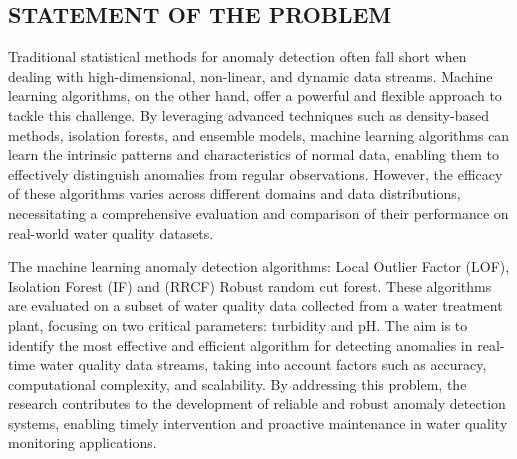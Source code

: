 \documentclass[12pt]{report}
\begin{document}
\subsection{STATEMENT OF THE PROBLEM}
\par
Traditional statistical methods for anomaly detection often fall short when dealing with high-dimensional, non-linear, and dynamic data streams. Machine learning algorithms, on the other hand, offer a powerful and flexible approach to tackle this challenge. By leveraging advanced techniques such as density-based methods, isolation forests, and ensemble models, machine learning algorithms can learn the intrinsic patterns and characteristics of normal data, enabling them to effectively distinguish anomalies from regular observations. However, the efficacy of these algorithms varies across different domains and data distributions, necessitating a comprehensive evaluation and comparison of their performance on real-world water quality datasets.
\par
The  machine learning anomaly detection algorithms: Local Outlier Factor (LOF), Isolation Forest (IF) and  (RRCF) Robust
random cut forest. These algorithms are evaluated on a subset of water quality data collected from a water treatment plant, focusing on two critical parameters: turbidity and pH. The aim is to identify the most effective and efficient algorithm for detecting anomalies in real-time water quality data streams, taking into account factors such as accuracy, computational complexity, and scalability. By addressing this problem, the research contributes to the development of reliable and robust anomaly detection systems, enabling timely intervention and proactive maintenance in water quality monitoring applications.
\end{document}
